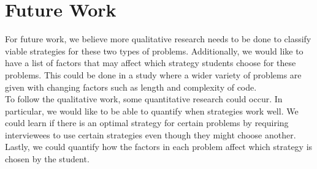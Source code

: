 \section{Future Work}

For future work, we believe more qualitative research needs to be done to classify viable strategies for these two types of problems. 
Additionally, we would like to have a list of factors that may affect which strategy students choose for these problems. 
This could be done in a study where a wider variety of problems are given with changing factors such as length and complexity of code. 
\\

To follow the qualitative work, some quantitative research could occur. 
In particular, we would like to be able to quantify when strategies work well. 
We could learn if there is an optimal strategy for certain problems by requiring interviewees to use certain strategies even though they might choose another. 
Lastly, we could quantify how the factors in each problem affect which strategy is chosen by the student. 

\newpage
